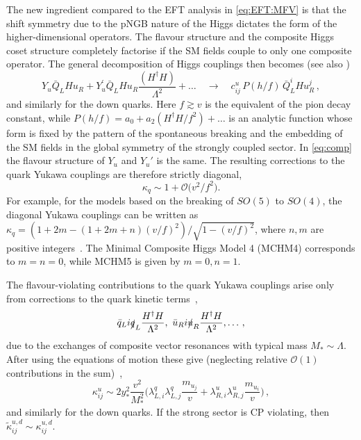\documentclass[../report.tex]{subfiles}
\begin{document}
The new ingredient compared to the EFT analysis in \eqref{eq:EFT:MFV}
is that the shift symmetry due to the pNGB nature of the Higgs
dictates the form of the higher-dimensional operators. The flavour
structure and the composite Higgs coset structure completely factorise
if the SM fields couple to only one composite operator. The general
decomposition of Higgs couplings then becomes \cite{Agashe:2009di}
(see also \cite{Gillioz:2012se,Delaunay:2013iia,Azatov:2014lha})
\begin{equation}\label{eq:comp}
	Y_u \bar{Q}_L H u_R + Y_u^\prime\bar{Q}_L H u_R
        \frac{(H^\dagger H)}{\Lambda^2}+\ldots \quad \to \quad
        c_{ij}^u \, P(h/f) \, \bar{Q}_L^i H u_R^j \,,
\end{equation}
and similarly for the down quarks. Here $f\gtrsim v$ is the equivalent
of the pion decay constant, while $P(h/f)=a_0+a_2 (H^\dagger H/f^2)+\ldots
$ is an analytic function whose form is fixed by the  pattern of the
spontaneous breaking and the embedding of the SM fields in the global
symmetry of the strongly coupled sector. In \eqref{eq:comp} the flavour
structure of $Y_u$ and $Y_u'$ 
is the same. The resulting corrections to the quark Yukawa couplings 
are therefore strictly diagonal, 
\begin{equation}\label{eq:kappaq:estimate}
\kappa_q\sim 1+{\mathcal O}\big({v^2}/{f^2}\big).
\end{equation}
For example, for the models based on the breaking of $SO(5)$ to
$SO(4)$, the diagonal Yukawa couplings can be written as
$\kappa_q=(1+2m-(1+2m+n)(v/f)^2)/{\sqrt{1-(v/f)^2}}$, where $n,m$ are
positive integers~\cite{Pomarol:2012qf}. The Minimal Composite Higgs
Model 4 (MCHM4) corresponds to $m=n=0$, while MCHM5 is given by
$m=0,n=1$.

The flavour-violating contributions to the quark Yukawa couplings
arise only from corrections to the quark kinetic terms~\cite{Agashe:2009di},
\begin{equation}
\bar q_L i \slashed q_L \frac{H^\dagger H}{\Lambda^2}, \,\,
\bar u_R i \slashed u_R \frac{H^\dagger H}{\Lambda^2},
\dots\,,
\end{equation}
due to the exchanges of composite vector resonances
with typical mass $M_* \sim \Lambda$. After using the equations of
motion 
these give (neglecting relative ${\mathcal O}(1)$ contributions
in the sum)~\cite{Agashe:2009di, Azatov:2014lha, Delaunay:2013pja},
\begin{equation}
\kappa_{ij}^u\sim 2 y_*^2 \frac{v^2}{M_*^2}
\Big(\lambda_{L,i}^q\lambda_{L,j}^q \frac{m_{u_j}}{v}
+\lambda_{R,i}^u\lambda_{R,j}^u \frac{m_{u_i}}{v}\Big)\,,
\end{equation}
and similarly for the down quarks. If the strong sector is CP
violating, then $\tilde \kappa_{ij}^{u,d}\sim \kappa_{ij}^{u,d}$.
\end{document}
